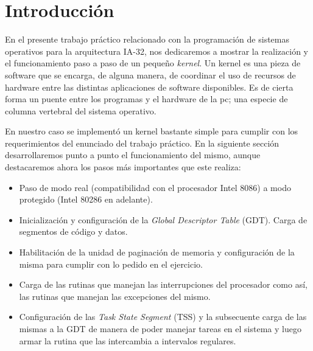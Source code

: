 \section{Introducción}

En el presente trabajo práctico relacionado con la programación de sistemas operativos para la arquitectura IA-32, nos dedicaremos a mostrar la realización y el funcionamiento paso a paso de un pequeño \emph{kernel}. Un kernel es una pieza de software que se encarga, de alguna manera, de coordinar el uso de recursos de hardware entre las distintas aplicaciones de software disponibles. Es de cierta forma un puente entre los programas y el hardware de la pc; una especie de columna vertebral del sistema operativo. 

En nuestro caso se implementó un kernel bastante simple para cumplir con los requerimientos del enunciado del trabajo práctico. En la siguiente sección desarrollaremos punto a punto el funcionamiento del mismo, aunque destacaremos ahora los pasos más importantes que este realiza:

\begin{itemize}
\item Paso de modo real (compatibilidad con el procesador Intel 8086) a modo protegido (Intel 80286 en adelante).
\item Inicialización y configuración de la \emph{Global Descriptor Table} (GDT). Carga de segmentos de código y datos.
\item Habilitación de la unidad de paginación de memoria y configuración de la misma para cumplir con lo pedido en el ejercicio.
\item Carga de las rutinas que manejan las interrupciones del procesador como así, las rutinas que manejan las excepciones del mismo.
\item Configuración de las \emph{Task State Segment} (TSS) y la subsecuente carga de las mismas a la GDT de manera de poder manejar tareas en el sistema y luego armar la rutina que las intercambia a intervalos regulares.
\end{itemize}

